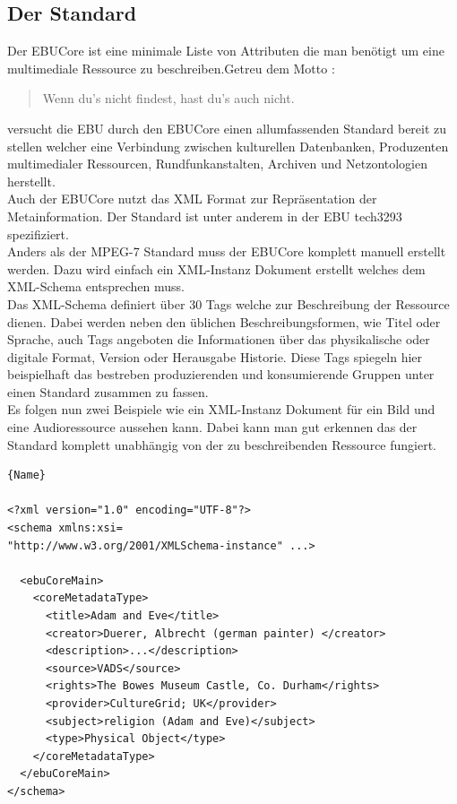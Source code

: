 	\subsection{Der Standard}
	Der EBUCore ist eine minimale Liste von Attributen die man benötigt um eine multimediale Ressource zu beschreiben.Getreu dem Motto :\begin{quote}Wenn du's nicht findest, hast du's auch nicht.\end{quote} versucht die EBU durch den EBUCore einen allumfassenden Standard bereit zu stellen welcher eine Verbindung zwischen kulturellen Datenbanken, Produzenten multimedialer Ressourcen, Rundfunkanstalten, Archiven und Netzontologien herstellt.\\
Auch der EBUCore nutzt das XML Format zur Repräsentation der Metainformation. Der Standard ist unter anderem in der EBU tech3293 spezifiziert.\\Anders als der MPEG-7 Standard muss der EBUCore komplett manuell erstellt werden. Dazu wird einfach ein XML-Instanz Dokument erstellt welches dem XML-Schema entsprechen muss.\\Das XML-Schema definiert über 30 Tags welche zur Beschreibung der Ressource dienen. Dabei werden neben den üblichen Beschreibungsformen, wie Titel oder Sprache, auch Tags angeboten die Informationen über das physikalische oder digitale  Format, Version oder Herausgabe Historie. Diese Tags spiegeln hier beispielhaft das bestreben produzierenden und konsumierende Gruppen unter einen Standard zusammen zu fassen.\\
Es folgen nun zwei Beispiele wie ein XML-Instanz Dokument für ein Bild und eine Audioressource aussehen kann. Dabei kann man gut erkennen das der Standard komplett unabhängig von der zu beschreibenden Ressource fungiert.

\begin{lstlisting}[caption=Beispiel-XML EBUCore für Albrecht Dürers Bild: Adam und Eva]{Name}

<?xml version="1.0" encoding="UTF-8"?>
<schema xmlns:xsi=
"http://www.w3.org/2001/XMLSchema-instance" ...>

  <ebuCoreMain>
    <coreMetadataType>
      <title>Adam and Eve</title>
      <creator>Duerer, Albrecht (german painter) </creator>
      <description>...</description>
      <source>VADS</source>  
      <rights>The Bowes Museum Castle, Co. Durham</rights>
      <provider>CultureGrid; UK</provider>
      <subject>religion (Adam and Eve)</subject>
      <type>Physical Object</type>
    </coreMetadataType>
  </ebuCoreMain>
</schema>
\end{lstlisting}


